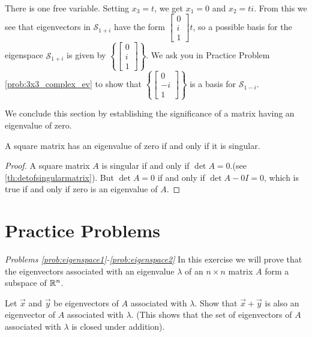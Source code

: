 \documentclass{ximera}
\begin{document}
\begin{example}
\begin{explanation}
\begin{align*}
\end{align*}
There is one free variable.  Setting $x_3=t$, we get $x_1=0$ and $x_2=ti$.  From this we see that eigenvectors in $\mathcal{S}_{1+i}$ have the form $\begin{bmatrix}0\\i\\1\end{bmatrix}t$, so a possible basis for the eigenspace $\mathcal{S}_{1+i}$ is given by $\left\{\begin{bmatrix}0\\i\\1\end{bmatrix}\right\}$.
We ask you in Practice Problem \ref{prob:3x3_complex_ev} to show that $\left\{\begin{bmatrix}0\\-i\\1\end{bmatrix}\right\}$ is a basis for $\mathcal{S}_{1-i}$.
\end{explanation}
\end{example}

We conclude this section by establishing the significance of a matrix having an eigenvalue of zero.

\begin{theorem}\label{th:zero_ew}
A square matrix has an eigenvalue of zero if and only if it is singular.
\end{theorem}

\begin{proof}
A square matrix $A$ is singular if and only if $\det{A}=0$.(see  \ref{th:detofsingularmatrix}).  But $\det{A}=0$ if and only if $\det{A-0I}=0$, which is true if and only if zero is an eigenvalue of $A$.
\end{proof}

\section*{Practice Problems}

\emph{Problems \ref{prob:eigenspace1}-\ref{prob:eigenspace2}}
In this exercise we will prove that the eigenvectors associated with an eigenvalue $\lambda$ of an $n \times n$ matrix $A$ form a subspace of $\mathbb{R}^n$.

\begin{problem}\label{prob:eigenspace1}
Let $\vec{x}$ and $\vec{y}$ be eigenvectors of $A$ associated with $\lambda$.  Show that $\vec{x}+\vec{y}$ is also an eigenvector of $A$ associated with $\lambda$.  (This shows that the set of eigenvectors of $A$ associated with $\lambda$ is closed under addition).
\end{problem}
\end{document}
